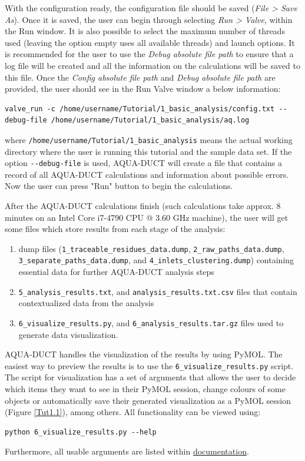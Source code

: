 \documentclass[9pt,tutorial]{livecoms}
\begin{document}
With the configuration ready, the configuration file should be saved (\emph{File > Save As}). Once it is saved, the user can begin through selecting \emph{Run > Valve}, within the Run window. It is also possible to select the maximum number of threads used (leaving the option empty uses all available threads) and launch options. It is recommended for the user to use the \textit{Debug absolute file path} to ensure that a log file will be created and all the information on the calculations will be saved to this file. Once the \textit{Config absolute file path} and \textit{Debug absolute file path} are provided, the user should see in the Run Valve window a below information: 
\begin{lstlisting}
valve_run -c /home/username/Tutorial/1_basic_analysis/config.txt --debug-file /home/username/Tutorial/1_basic_analysis/aq.log
\end{lstlisting}
where \texttt{/home/username/Tutorial/1\_basic\_analysis} means the actual working directory where the user is running this tutorial and the sample data set.
If the option \texttt{-{}-debug-file} is used, AQUA-DUCT will create a file that contains a record of all AQUA-DUCT calculations and information about possible errors. 
Now the user can press "Run" button to begin the calculations. 

After the AQUA-DUCT calculations finish (such calculations take approx. 8 minutes on an Intel Core i7-4790 CPU @ 3.60 GHz machine), the user will get some files which store results from each stage of the analysis:

\begin{enumerate}
    \item dump files (\texttt{1\_traceable\_residues\_data.dump}, \texttt{2\_raw\_paths\_data.dump}, \texttt{3\_separate\_paths\_data.dump}, and \texttt{4\_inlets\_clustering.dump}) containing essential data for further AQUA-DUCT analysis steps
    \item \texttt{5\_analysis\_results.txt}, \hfill and \newline \texttt{analysis\_results.txt.csv} files that contain contextualized data from the analysis
    \item \texttt{6\_visualize\_results.py}, \hfill and \newline \texttt{6\_analysis\_results.tar.gz} files used to generate data visualization.
\end{enumerate}

AQUA-DUCT handles the visualization of the results by using PyMOL. The easiest way to preview the results is to use the \texttt{6\_visualize\_results.py} script.
The script for visualization has a set of arguments that allows the user to decide which items they want to see in their PyMOL session, change colours of some objects or automatically save their generated visualization as a PyMOL session (Figure \ref{Tut1.1}), among others. All functionality can be viewed using:
\begin{lstlisting}
python 6_visualize_results.py --help
\end{lstlisting}
Furthermore, all usable arguments are listed within \href{https://tunneling-group.github.io/aqua-duct/valve/valve_manual.html?highlight=visualize\%20results#visualization}{documentation}.
\end{document}
